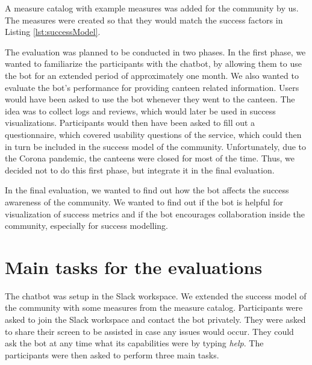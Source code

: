 A measure catalog with example measures was added for the community by us. The measures were created so that they would match the success factors in Listing \ref{lst:successModel}.

The evaluation was planned to be conducted in two phases.
In the first phase, we wanted to familiarize the participants with the chatbot, by allowing them to use the bot for an extended period of approximately one month. 
We also wanted to evaluate the bot's performance for providing canteen related information.
Users would have been asked to use the bot whenever they went to the canteen. 
The idea was to collect logs and reviews, which would later be used in success visualizations. 
Participants would then have been asked to fill out a questionnaire, which covered usability questions of the service, which could then in turn be included in the success model of the community.
Unfortunately, due to the Corona pandemic, the canteens were closed for most of the time. Thus, we decided not to do this first phase, but integrate it in the final evaluation.

In the final evaluation, we wanted to find out how the bot affects the success awareness of the community.
We wanted to find out if the bot is helpful for visualization of success metrics and if the bot encourages collaboration inside the community, especially for success modelling.



\section{Main tasks for the evaluations}

The chatbot was setup in the Slack workspace. 
We extended the success model of the community with some measures from the measure catalog. 
Participants were asked to join the Slack workspace and contact the bot privately. They were asked to share their screen to be assisted in case any issues would occur. They could ask the bot at any time what its capabilities were by typing \emph{help}.
The participants were then asked to perform three main tasks.

